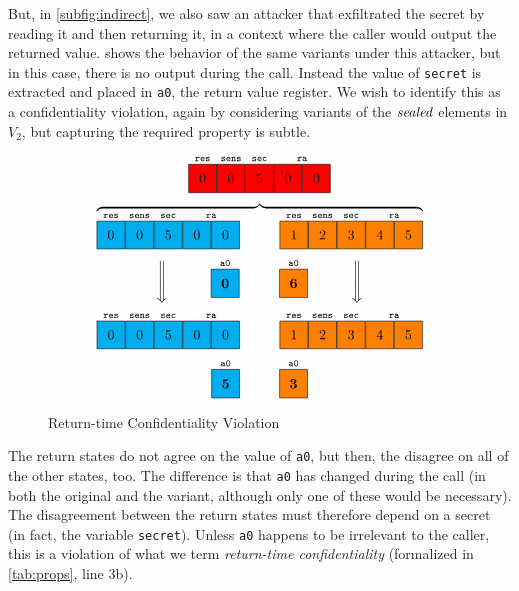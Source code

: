 \documentclass[10pt,conference]{ieeetran}%
\theoremstyle{definition}
\begin{document}
But, in \cref{subfig:indirect}, we also saw an attacker that exfiltrated the secret
by reading it and then returning it, in a context where the caller would output the returned
value.  shows the behavior of the same variants under this attacker,
but in this case, there is no output during the call. Instead the value of {\tt secret} is
extracted and placed in {\tt a0}, the return value register. We wish to identify this as
a confidentiality violation, again by considering variants of the \(\mathit{sealed}\)
elements in \(V_2\), but capturing the required property is subtle.
%
\begin{figure}
    \centering
    \[
    \stackrel{\texttt{res}}{\figfourbox[0]}
    \stackrel{\texttt{sens}}{\figfourbox[0]}
    \stackrel{\texttt{sec}}{\figfourbox[5]}
    \stackrel{\texttt{ra}}{\figfourbox[0]\figfourbox[0]}\]
    \[\overbrace{
    \stackrel{\texttt{res}}{\leftbox[0]}
    \stackrel{\texttt{sens}}{\leftbox[0]}
    \stackrel{\texttt{sec}}{\leftbox[5]}
    \stackrel{\texttt{ra}}{\leftbox[0]\leftbox[0]}
    \hspace{1cm}
    \stackrel{\texttt{res}}{\rightbox[1]}
    \stackrel{\texttt{sens}}{\rightbox[2]}
    \stackrel{\texttt{sec}}{\rightbox[3]}
    \stackrel{\texttt{ra}}{\rightbox[4]\rightbox[5]}}
    \]
    \[\raisebox{.5\height}{\Bigg\Downarrow} \hspace{1cm} \stackrel{\mathtt{a0}}{\leftbox[\bf 0]} \hspace{1cm}
    \stackrel{\mathtt{a0}}{\rightbox[\bf 6]} \hspace{1cm} \raisebox{.5\height}{\Bigg\Downarrow}\]
    \[
    \stackrel{\texttt{res}}{\leftbox[0]}
    \stackrel{\texttt{sens}}{\leftbox[0]}
    \stackrel{\texttt{sec}}{\leftbox[5]}
    \stackrel{\texttt{ra}}{\leftbox[0]\leftbox[0]}
    \hspace{1cm}
    \stackrel{\texttt{res}}{\rightbox[1]}
    \stackrel{\texttt{sens}}{\rightbox[2]}
    \stackrel{\texttt{sec}}{\rightbox[3]}
    \stackrel{\texttt{ra}}{\rightbox[4]\rightbox[5]}
    \]
    \[\stackrel{\mathtt{a0}}{\leftbox[\bf 5]} \hspace{1cm}
    \stackrel{\mathtt{a0}}{\rightbox[\bf 3]}\]
  \caption{Return-time Confidentiality Violation}
  \label{fig:variant3}
\end{figure}
%
The return states do not agree on the value of {\tt a0}, but then, the disagree on
all of the other states, too. The difference is that {\tt a0} has changed during the call
(in both the original and the variant, although only one of these would be necessary).
The disagreement between the return states must therefore depend on a secret
(in fact, the variable {\tt secret}).
Unless {\tt a0} happens to be irrelevant to the caller, this is a violation of what
we term {\it return-time confidentiality} (formalized in \cref{tab:props}, line 3b).
\end{document}
